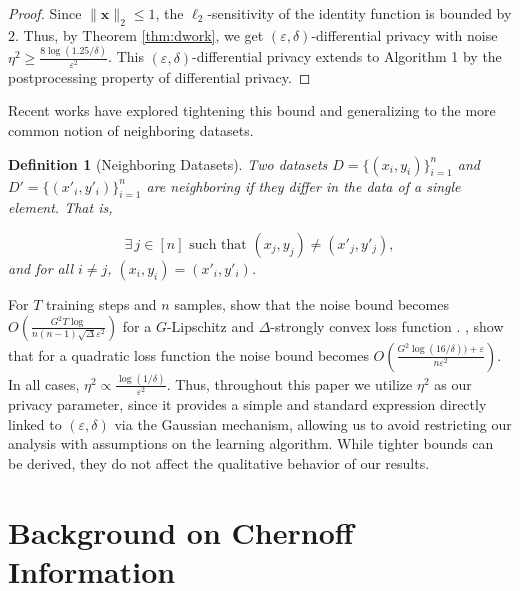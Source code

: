 \documentclass[11pt,letterpaper]{article}
\newtheorem{definition}{Definition}
\begin{document}
\begin{proof}
    Since $\| \mathbf{x}\|_2 \leq 1$, the $\ell_2$-sensitivity of the identity function is bounded by $2$. Thus, by Theorem \ref{thm:dwork}, we get $(\varepsilon, \delta)$-differential privacy with noise $\eta^2 \geq \frac{8\log(1.25/\delta)}{\varepsilon^2}$. This $(\varepsilon, \delta)$-differential privacy extends to Algorithm 1 by the postprocessing property of differential privacy.
\end{proof}

Recent works have explored tightening this bound and generalizing to the more common notion of neighboring datasets.


\begin{definition}[Neighboring Datasets] \label{def:neighbor}
Two datasets $D = \{(x_i,y_i)\}_{i=1}^n$ and $D' = \{(x'_i,y'_i)\}_{i=1}^n$ are \emph{neighboring} if they differ in the data of a single element. That is,

$$\exists\, j \in [n] \text{ such that } (x_j,y_j) \neq (x'_j,y'_j),$$
and for all $i \neq j$, $(x_i,y_i) = (x'_i,y'_i)$.
\end{definition}






For $T$ training steps and $n$ samples, \citet{kang2020inputperturbationnewparadigm} show that the noise bound becomes $O(\frac{G^2T\log}{n(n-1)\sqrt{\Delta}\varepsilon^2})$ for a $G$-Lipschitz and $\Delta$-strongly convex loss function . \citet{fukuchi2017differentially}, show that for a quadratic loss function the noise bound becomes $O(\frac{G^2\log(16/\delta)) + \varepsilon}{n\varepsilon^2})$. In all cases, $\eta^2 \propto \frac{\log(1/\delta)}{\varepsilon^2}$. Thus, throughout this paper we utilize $\eta^2$ as our privacy parameter, since it 
provides a simple and standard expression directly linked to $(\varepsilon,\delta)$ 
via the Gaussian mechanism, allowing us to avoid restricting our analysis with assumptions on the learning algorithm. While tighter bounds can be derived, they do not affect the qualitative behavior of our results.



\section{Background on Chernoff Information} \label{sec:ci}


\setcounter{figure}{0}
\end{document}
